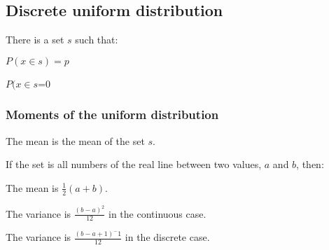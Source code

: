 
\subsection{Discrete uniform distribution}

There is a set \(s\) such that:

\(P(x\in s)=p\)

\(P(x\in s\)=0\)

\subsubsection{Moments of the uniform distribution}

The mean is the mean of the set \(s\).

If the set is all numbers of the real line between two values, \(a\) and \(b\), then:

The mean is \(\frac{1}{2}(a+b)\).

The variance is \(\frac{(b-a)^2}{12}\) in the continuous case.

The variance is \(\frac{(b-a+1)^-1}{12}\) in the discrete case.

